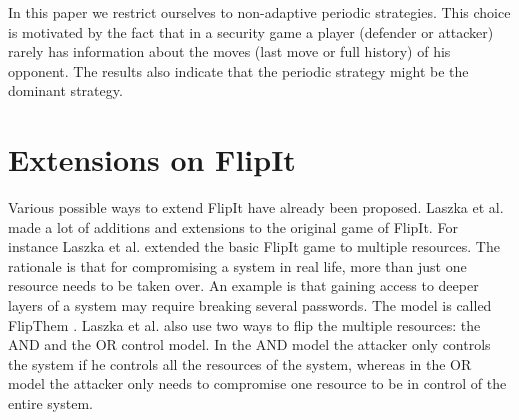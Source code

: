  In this paper we restrict ourselves to non-adaptive periodic strategies. This choice is motivated by the fact that in a security game a player (defender or attacker) rarely has information about the moves (last move or full history) of his opponent. The results also indicate that the periodic strategy might be the dominant strategy.  \\
 
\section{Extensions on FlipIt}
\label{ch1:extendedWork}

Various possible ways to extend FlipIt have already been proposed. 
Laszka et al. made a lot of additions and extensions to the original game of FlipIt. For instance Laszka et al. extended the basic FlipIt game to multiple resources. The rationale is that for compromising a system in real life, more than just one resource needs to be taken over. An example is that gaining access to deeper layers of a system may require breaking several passwords. The model is called FlipThem \cite{FlipThem}. Laszka et al. also use two ways to flip the multiple resources: the AND and the OR control model. In the AND model the attacker only controls the system if he controls all the resources of the system, whereas in the OR model the attacker only needs to compromise one resource to be in control of the entire system. \\

